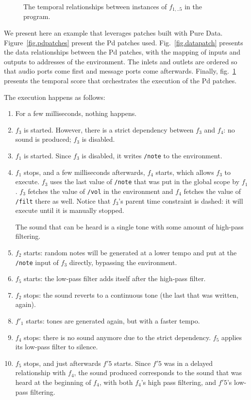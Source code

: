 \documentclass{article}
\begin{document}
\begin{figure}
    \centering
    \begin{tikzpicture}
    
    \end{tikzpicture}
    \caption{The temporal relationships between instances of $f_{1,..5}$ in the program.}
    \label{fig.timepatch}
\end{figure}

We present here an example that leverages patches built with Pure Data\cite{puckette1996pure}.
Figure~\ref{fig.pdpatches} present the Pd patches used. Fig.~\ref{fig.datapatch} presents the data relationships between the Pd patches, with the mapping of inputs and outputs to addresses of the environment. 
The inlets and outlets are ordered so that audio ports come first and message ports come afterwards.
Finally, fig.~\ref{fig.timepatch} presents the temporal score that orchestrates the execution of the Pd patches.

The execution happens as follows: 
\begin{enumerate}
    \item For a few milliseconds, nothing happens.
    \item $f_3$ is started. However, there is a strict dependency between $f_3$ and $f_4$: no sound is produced; $f_3$ is disabled.
    \item $f_1$ is started. Since $f_3$ is disabled, it writes \lstinline|/note| to the environment.
    \item $f_1$ stops, and a few milliseconds afterwards, $f_4$ starts, which allows  $f_3$ to execute. $f_3$ uses the last value of \lstinline|/note| that was put in the global scope by $f_1$.
    $f_3$ fetches the value of \lstinline|/vol| in the environment and $f_4$ fetches the value of \lstinline|/filt| there as well.
    Notice that $f_3$'s parent time constraint is dashed: it will execute until it is manually stopped.
    
    The sound that can be heard is a single tone with some amount of high-pass filtering.
    \item $f_2$ starts: random notes will be generated at a lower tempo and put at the \lstinline|/note| input of $f_3$ directly, bypassing the environment.
    
    \item $f_5$ starts: the low-pass filter adds itself after the high-pass filter.
    \item $f_2$ stops: the sound reverts to a continuous tone (the last that was written, again).
    \item $f'_1$ starts: tones are generated again, but with a faster tempo.
    \item $f_4$ stops: there is no sound anymore due to the strict dependency. $f_5$ applies its low-pass filter to silence.
    \item $f_5$ stops, and just afterwards $f'5$ starts. Since $f'5$ was in a delayed relationship with $f_4$, the sound produced corresponds to the sound that was heard at the beginning of $f_4$, with both $f_4$'s high pass filtering, and $f'5$'s low-pass filtering.
\end{enumerate}
\end{document}

